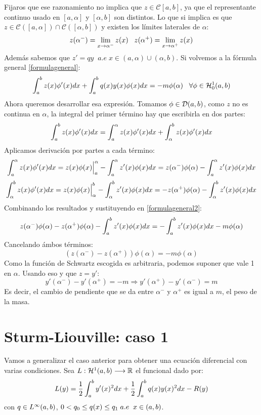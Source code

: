 Fijaros que ese razonamiento no implica que $z\in\mathcal{C}[a,b]$, ya que el representante continuo usado en $[a,\alpha]$ y $[\alpha,b]$ son distintos. Lo que si implica es que $z\in\mathcal{C}\left([a,\alpha]\right)\cap \mathcal{C}\left([\alpha,b]\right)$ y existen los límites laterales de $\alpha$:
\[
z(\alpha^-)=\displaystyle\lim_{ x \to \alpha^- } z(x) \;\;\; z(\alpha^+)=\displaystyle\lim_{ x \to \alpha^+ } z(x)
\]
Además sabemos que $z'=qy \;\; a.e \; x \in(a,\alpha)\cup(\alpha,b)$. Si volvemos a la fórmula general \eqref{formulageneral}:
\begin{equation}
\label{formulageneral2}
\displaystyle\int_{ a }^{ b } z(x)\phi'(x)dx+\displaystyle\int_{ a }^{ b } q(x)y(x)\phi(x)dx=-m\phi(\alpha) \;\;\; \forall\phi\in\mathcal{H}_0^{ 1 } (a,b)
\end{equation}
Ahora queremos desarrollar esa expresión. Tomamos $\phi\in\mathcal{D}(a,b)$, como $z$ no es continua en $\alpha$, la integral del primer término hay que escribirla en dos partes:
\[
\displaystyle\int_{ a }^{ b } z(x)\phi'(x)dx=\displaystyle\int_{ a }^{ \alpha } z(x)\phi'(x)dx+\displaystyle\int_{ \alpha }^{ b } z(x)\phi'(x)dx
\]
Aplicamos derivación por partes a cada término:
\[
\displaystyle\int_{ a }^{ \alpha } z(x)\phi'(x)dx=z(x)\phi(x)\Big|_a^\alpha-\displaystyle\int_{ a }^{ \alpha } z'(x)\phi(x)dx=z(\alpha^-)\phi(\alpha)-\displaystyle\int_{ a }^{ \alpha } z'(x)\phi(x)dx
\]
\[
\displaystyle\int_{ \alpha }^{ b } z(x)\phi'(x)dx=z(x)\phi(x)\Big|_\alpha^b-\displaystyle\int_{ \alpha }^{ b } z'(x)\phi(x)dx=-z(\alpha^+)\phi(\alpha)-\displaystyle\int_{ \alpha }^{ b } z'(x)\phi(x)dx
\]
Combinando los resultados y sustituyendo en \eqref{formulageneral2}:
\[
z(\alpha^-)\phi(\alpha)-z(\alpha^+)\phi(\alpha)-\displaystyle\int_{ a }^{ b } z'(x)\phi(x)dx=-\displaystyle\int_{ a }^{ b } z'(x)\phi(x)dx-m\phi(\alpha)
\]
Cancelando ámbos términos:
\[
\left(z(\alpha^-)-z(\alpha^+)\right)\phi(\alpha)=-m\phi(\alpha)
\]
Como la función de Schwartz escogida es arbitraria, podemos suponer que vale 1 en $\alpha$. Usando eso y que $z=y'$:
\[
y'(\alpha^-)-y'(\alpha^+)=-m \Rightarrow y'(\alpha^+)-y'(\alpha^-)=m  
\]
Es decir, el cambio de pendiente que se da entre $\alpha^-$ y $\alpha^+$ es igual a $m$, el peso de la masa.

\section{Sturm-Liouville: caso 1}\label{slc1}

Vamos a generalizar el caso anterior para obtener una ecuación diferencial con varias condiciones. Sea $L : \mathcal{H}^{ 1 } (a,b) \longrightarrow \mathbb{R}$ el funcional dado por:
\[
L(y)=\frac{1}{2}\displaystyle\int_{ a }^{ b } y'(x)^2dx+\frac{1}{2}\displaystyle\int_{ a }^{ b } q(x)y(x)^2dx-R(y)
\]
con $q\in L^{ \infty }(a,b)$, $0<q_0\leq q(x)\leq q_1 \; a.e \;\; x\in(a,b)$. 

